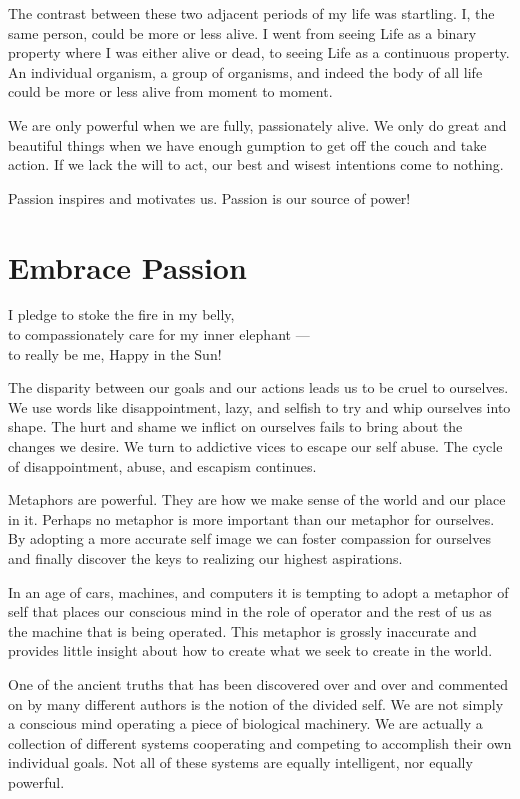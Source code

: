 \documentclass[ebook,12pt,openany,twoside]{memoir}
\newcommand{\imagefacingchapter}[1]{
  \cleartoverso
  \clearpage \null
  \thispagestyle{cleared}
  \AddToShipoutPictureBG*{%
    \AtStockLowerLeft{%
      \texttt{[image: \#1]}
    }
  }
  \clearpage
}
\begin{document}
The contrast between these two adjacent periods of my life was startling. I,
the same person, could be more or less alive. I went from seeing Life as a
binary property where I was either alive or dead, to seeing Life as a
continuous property. An individual organism, a group of organisms, and indeed
the body of all life could be more or less alive from moment to moment.

We are only powerful when we are fully, passionately alive. We only do great
and beautiful things when we have enough gumption to get off the couch and take
action. If we lack the will to act, our best and wisest intentions come to nothing.

Passion inspires and motivates us. Passion is our source of power!




\imagefacingchapter{images/RidingElephant}
\chapter{Embrace Passion}
\setlength\epigraphwidth{3.0in}
\epigraph{
  I pledge to stoke the fire in my belly,\\
  to compassionately care for my inner elephant ---\\
  to really be me, Happy in the Sun!
}{}

\noindent The disparity between our goals and our actions leads us to be cruel
to ourselves. We use words like disappointment, lazy, and selfish to try and
whip ourselves into shape. The hurt and shame we inflict on ourselves fails to
bring about the changes we desire. We turn to addictive vices to escape our
self abuse.  The cycle of disappointment, abuse, and escapism continues.

Metaphors are powerful. They are how we make sense of the world and our place
in it. Perhaps no metaphor is more important than our metaphor for ourselves.
By adopting a more accurate self image we can foster compassion for ourselves
and finally discover the keys to realizing our highest aspirations.

In an age of cars, machines, and computers it is tempting to adopt a metaphor
of self that places our conscious mind in the role of operator and the rest of
us as the machine that is being operated. This metaphor is grossly inaccurate
and provides little insight about how to create what we seek to create in the
world.

One of the ancient truths that has been discovered over and over and commented
on by many different authors is the notion of the divided self. We are not
simply a conscious mind operating a piece of biological machinery. We are
actually a collection of different systems cooperating and competing to
accomplish their own individual goals. Not all of these systems are equally
intelligent, nor equally powerful.
\end{document}
